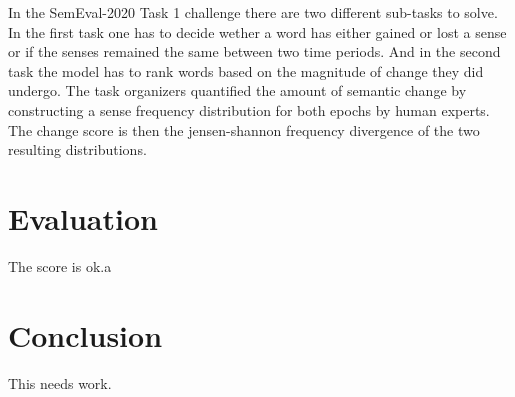 \documentclass[11pt]{article}
\begin{document}
In the SemEval-2020 Task 1 challenge there are two different sub-tasks to solve. 
In the first task one has to decide wether a word has either gained or lost a sense or 
if the senses remained the same between two time periods. And in the second task the model 
has to rank words based on the magnitude of change they did undergo. 
The task organizers quantified the amount of semantic change by constructing a sense frequency distribution
for both epochs by human experts. The change score is then the jensen-shannon frequency divergence of the two resulting distributions.

\section{Evaluation} 
The score is ok.a

\section{Conclusion}
This needs work.



\end{document}
